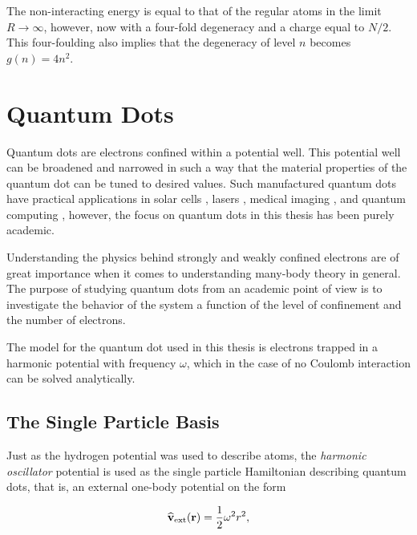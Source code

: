 The non-interacting energy is equal to that of the regular atoms in the limit $R\to\infty$, however, now with a four-fold degeneracy and a charge equal to $N/2$. This four-foulding also implies that the degeneracy of level $n$ becomes $g(n) = 4n^2$.

\section{Quantum Dots}
\label{sec:modelQDots}

Quantum dots are electrons confined within a potential well. This potential well can be broadened and narrowed in such a way that the material properties of the quantum dot can be tuned to desired values. Such manufactured quantum dots have practical applications in solar cells \cite{QDOTS_SOLAR}, lasers \cite{QDOTS_LASER}, medical imaging \cite{QDOTS_MEDICINE}, and quantum computing \cite{QDOTS_QUANTUM}, however, the focus on quantum dots in this thesis has been purely academic.

Understanding the physics behind strongly and weakly confined electrons are of great importance when it comes to understanding many-body theory in general. The purpose of studying quantum dots from an academic point of view is to investigate the behavior of the system a function of the level of confinement and the number of electrons.

The model for the quantum dot used in this thesis is electrons trapped in a harmonic potential with frequency $\omega$, which in the case of no Coulomb interaction can be solved analytically. 

\subsection{The Single Particle Basis}

Just as the hydrogen potential was used to describe atoms, the \textit{harmonic oscillator} potential is used as the single particle Hamiltonian describing quantum dots, that is, an external one-body potential on the form 

\begin{equation}
 {\bf\widehat{v}}_\mathrm{ext}(\mathbf{r)} = \frac{1}{2}\omega^2r^2,
\end{equation}


